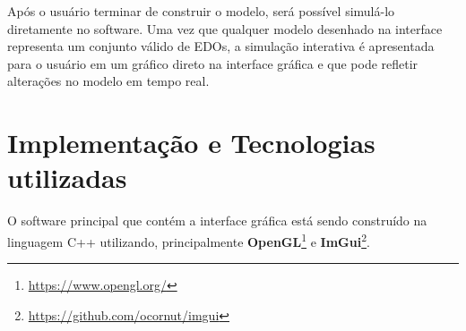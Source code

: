 \documentclass[
	12pt,				%
	openright,			%
	oneside,			%
	a4paper,			%
	main=brazil,
	english,			%
	]{ufsj-abntex2}
\begin{document}




Após o usuário terminar de construir o modelo, será possível simulá-lo diretamente no software. Uma vez que qualquer modelo desenhado na interface representa um conjunto válido de EDOs, a simulação interativa é apresentada para o usuário em um gráfico direto na interface gráfica e que pode refletir alterações no modelo em tempo real. 

\section{Implementação e Tecnologias utilizadas}
\label{sec:tecnologias}


O software principal que contém a interface gráfica está sendo construído na linguagem C++ utilizando, principalmente \textbf{OpenGL}\footnote{\href{https://www.opengl.org/}{https://www.opengl.org/}} e \textbf{ImGui}\footnote{\href{https://github.com/ocornut/imgui}{https://github.com/ocornut/imgui}}.
\end{document}
